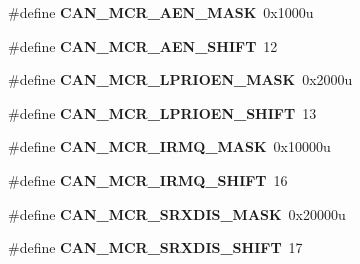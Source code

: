 \begin{DoxyCompactItemize}
\item 
\hypertarget{group___c_a_n___register___masks_gaf788111bd2bf9a69160d0a0cb713c926}{}\#define {\bfseries C\+A\+N\+\_\+\+M\+C\+R\+\_\+\+A\+E\+N\+\_\+\+M\+A\+S\+K}~0x1000u\label{group___c_a_n___register___masks_gaf788111bd2bf9a69160d0a0cb713c926}

\item 
\hypertarget{group___c_a_n___register___masks_ga6c610bd65cb9471ad0ca511dbe2c86d4}{}\#define {\bfseries C\+A\+N\+\_\+\+M\+C\+R\+\_\+\+A\+E\+N\+\_\+\+S\+H\+I\+F\+T}~12\label{group___c_a_n___register___masks_ga6c610bd65cb9471ad0ca511dbe2c86d4}

\item 
\hypertarget{group___c_a_n___register___masks_ga1420cc0cb40d414296a741397ee07116}{}\#define {\bfseries C\+A\+N\+\_\+\+M\+C\+R\+\_\+\+L\+P\+R\+I\+O\+E\+N\+\_\+\+M\+A\+S\+K}~0x2000u\label{group___c_a_n___register___masks_ga1420cc0cb40d414296a741397ee07116}

\item 
\hypertarget{group___c_a_n___register___masks_gaaf89fabb5183062196edf8dc4a3f6770}{}\#define {\bfseries C\+A\+N\+\_\+\+M\+C\+R\+\_\+\+L\+P\+R\+I\+O\+E\+N\+\_\+\+S\+H\+I\+F\+T}~13\label{group___c_a_n___register___masks_gaaf89fabb5183062196edf8dc4a3f6770}

\item 
\hypertarget{group___c_a_n___register___masks_gad68843c21c6243f255601d8973f4e7eb}{}\#define {\bfseries C\+A\+N\+\_\+\+M\+C\+R\+\_\+\+I\+R\+M\+Q\+\_\+\+M\+A\+S\+K}~0x10000u\label{group___c_a_n___register___masks_gad68843c21c6243f255601d8973f4e7eb}

\item 
\hypertarget{group___c_a_n___register___masks_gae30b928fb3ce512c48cb0be04af69acd}{}\#define {\bfseries C\+A\+N\+\_\+\+M\+C\+R\+\_\+\+I\+R\+M\+Q\+\_\+\+S\+H\+I\+F\+T}~16\label{group___c_a_n___register___masks_gae30b928fb3ce512c48cb0be04af69acd}

\item 
\hypertarget{group___c_a_n___register___masks_ga29b3d428d19a7204c53f56c7467172f1}{}\#define {\bfseries C\+A\+N\+\_\+\+M\+C\+R\+\_\+\+S\+R\+X\+D\+I\+S\+\_\+\+M\+A\+S\+K}~0x20000u\label{group___c_a_n___register___masks_ga29b3d428d19a7204c53f56c7467172f1}

\item 
\hypertarget{group___c_a_n___register___masks_gae2513ad87a72bc6f2bb88be59a3e0836}{}\#define {\bfseries C\+A\+N\+\_\+\+M\+C\+R\+\_\+\+S\+R\+X\+D\+I\+S\+\_\+\+S\+H\+I\+F\+T}~17\label{group___c_a_n___register___masks_gae2513ad87a72bc6f2bb88be59a3e0836}


\end{DoxyCompactItemize}
